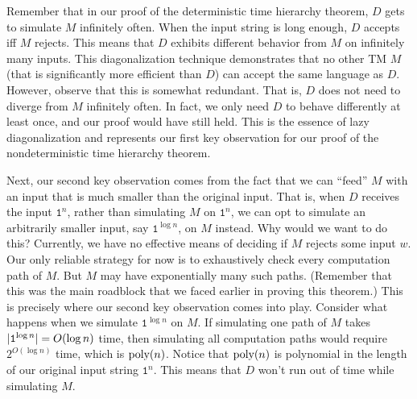 \documentclass[11pt,twoside=off,numbers=noenddot]{scrbook}
\begin{document}
\begin{proofidea}
  Remember that in our proof of the deterministic time hierarchy theorem, $D$ gets to simulate $M$ infinitely often. When the input string is long enough, $D$ accepts iff $M$ rejects. This means that $D$ exhibits different behavior from $M$ on infinitely many inputs. This diagonalization technique demonstrates that no other TM $M$ (that is significantly more efficient than $D$) can accept the same language as $D$. However, observe that this is somewhat redundant. That is, $D$ does not need to diverge from $M$ infinitely often. In fact, we only need $D$ to behave differently at least once, and our proof would have still held. This is the essence of lazy diagonalization and represents our first key observation for our proof of the nondeterministic time hierarchy theorem.

  Next, our second key observation comes from the fact that we can ``feed'' $M$ with an input that is much smaller than the original input. That is, when $D$ receives the input $\texttt{1}^n$, rather than simulating $M$ on $\texttt{1}^n$, we can opt to simulate an arbitrarily smaller input, say $\texttt{1}^{\log n}$, on $M$ instead. Why would we want to do this? Currently, we have no effective means of deciding if $M$ rejects some input $w$. Our only reliable strategy for now is to exhaustively check every computation path of $M$. But $M$ may have exponentially many such paths. (Remember that this was the main roadblock that we faced earlier in proving this theorem.) This is precisely where our second key observation comes into play. Consider what happens when we simulate $\texttt{1}^{\log n}$ on $M$. If simulating one path of $M$ takes $| \texttt{1}^{\log n} | = O(\log n)$ time, then simulating all computation paths would require $2^{O(\log n)}$ time, which is $\text{poly}(n)$. Notice that $\text{poly}(n)$ is polynomial in the length of our original input string $\texttt{1}^n$. This means that $D$ won't run out of time while simulating $M$.


\end{proofidea}
\end{document}
